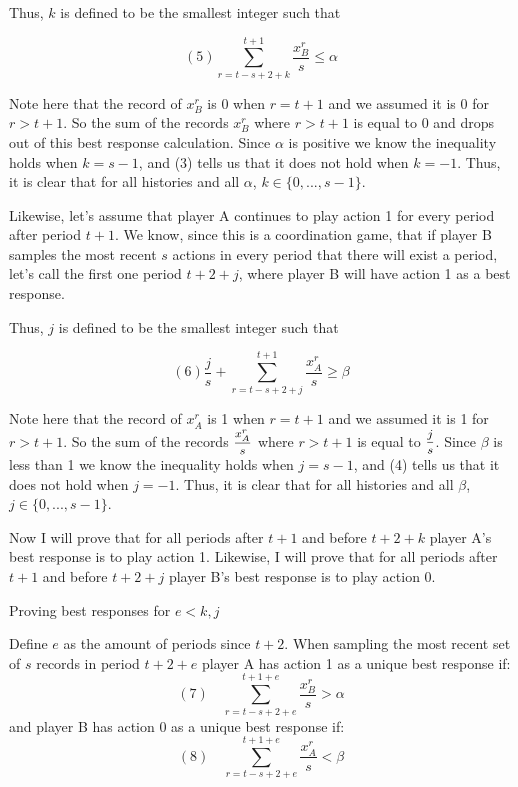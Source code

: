 \documentclass{article}
\begin{document}
\vskip12pt

Thus, $k$ is defined to be the smallest integer such that

$$(5) \sum\limits_{r=t-s+2+k}^{t+1} \frac{x^r_B}{s} \leq \alpha$$

Note here that the record of $x^r_B$ is 0 when $r=t+1$ and we assumed it is 0 for $r>t+1$. So the sum of the records $x^r_B$ where $r>t+1$ is equal to 0 and drops out of this best response calculation. Since $\alpha$ is positive we know the inequality holds when $k=s-1$, and (3) tells us that it does not hold when $k=-1$. Thus, it is clear that for all histories and all $\alpha$, $k \in \{0,...,s-1\}$.

\vskip12pt

Likewise, let's assume that player A continues to play action 1 for every period after period $t+1$. We know, since this is a coordination game, that if player B samples the most recent $s$ actions in every period that there will exist a period, let's call the first one period $t+2+j$, where player B will have action 1 as a best response.

\vskip12pt

Thus, $j$ is defined to be the smallest integer such that

$$(6) \frac{j}{s}+\sum\limits_{r=t-s+2+j}^{t+1} \frac{x^r_A}{s} \geq \beta$$

Note here that the record of $x^r_A$ is 1 when $r=t+1$ and we assumed it is 1 for $r>t+1$. So the sum of the records $\mfrac{x^r_A}{s}$ where $r>t+1$ is equal to $\mfrac{j}{s}$. Since $\beta$ is less than 1 we know the inequality holds when $j=s-1$, and (4) tells us that it does not hold when $j=-1$. Thus, it is clear that for all histories and all $\beta$, $j \in \{0,...,s-1\}$.

\vskip12pt

Now I will prove that for all periods after $t+1$ and before $t+2+k$ player A's best response is to play action 1. Likewise, I will prove that for all periods after $t+1$ and before $t+2+j$ player B's best response is to play action 0.

\vskip12pt

\centering

Proving best responses for $e<k,j$

\vskip6pt

\raggedright

Define $e$ as the amount of periods since $t+2$. When sampling the most recent set of $s$ records in period $t+2+e$ player A has action 1 as a unique best response if: 
$$(7) \hspace{12pt} \sum\limits_{r=t-s+2+e}^{t+1+e} \frac{x^r_B}{s} > \alpha$$
and player B has action 0 as a unique best response if:
$$(8) \hspace{12pt} \sum\limits_{r=t-s+2+e}^{t+1+e} \frac{x^r_A}{s} < \beta$$
\end{document}
